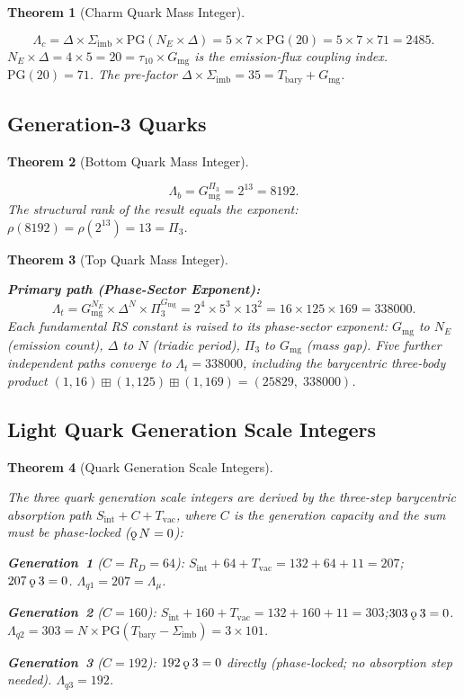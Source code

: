 \documentclass[11pt,letterpaper]{article}
\theoremstyle{plain}
\newtheorem{theorem}{Theorem}[section]
\theoremstyle{definition}
\theoremstyle{remark}
\newcommand{\bplus}{\boxplus}
\newcommand{\rank}{\rho}
\newcommand{\koppa}{\mathbin{\text{\rm\k{o}}}}
\newcommand{\Tbary}{T_{\mathrm{bary}}}
\newcommand{\Sint}{S_{\mathrm{int}}}
\newcommand{\Sigimb}{\Sigma_{\mathrm{imb}}}
\newcommand{\PG}{\mathrm{PG}}
\newcommand{\Gmg}{G_{\mathrm{mg}}}
\newcommand{\Tvac}{T_{\mathrm{vac}}}
\newcommand{\tauX}{\tau_{10}}
\newcommand{\Pithree}{\Pi_3}
\newcommand{\RD}{R_D}
\newcommand{\Lambdamu}{\Lambda_\mu}
\begin{document}
\begin{theorem}[Charm Quark Mass Integer]\label{thm:charm}
\begin{rsbox}
\[
\Lambda_c=\Delta\times\Sigimb\times\PG(N_E\times\Delta)
=5\times7\times\PG(20)=5\times7\times71=2485.
\]
$N_E\times\Delta=4\times5=20=\tauX\times\Gmg$ is the
emission-flux coupling index.  $\PG(20)=71$.  The pre-factor
$\Delta\times\Sigimb=35=\Tbary+\Gmg$.
\end{rsbox}
\end{theorem}

\subsection{Generation-3 Quarks}

\begin{theorem}[Bottom Quark Mass Integer]\label{thm:bottom}
\begin{rsbox}
\[
\Lambda_b=\Gmg^{\Pithree}=2^{13}=8192.
\]
The structural rank of the result equals the exponent:
$\rank(8192)=\rank(2^{13})=13=\Pithree$.
\end{rsbox}
\end{theorem}

\begin{theorem}[Top Quark Mass Integer]\label{thm:top}
\begin{rsbox}
\textbf{Primary path (Phase-Sector Exponent):}
\[
\Lambda_t=\Gmg^{N_E}\times\Delta^N\times\Pithree^{\Gmg}
=2^4\times5^3\times13^2=16\times125\times169=338000.
\]
Each fundamental RS constant is raised to its phase-sector
exponent: $\Gmg$ to $N_E$ (emission count), $\Delta$ to $N$
(triadic period), $\Pithree$ to $\Gmg$ (mass gap).  Five further
independent paths converge to $\Lambda_t=338000$, including the
barycentric three-body product
$(1,16)\bplus(1,125)\bplus(1,169)=(25829,\;338000)$.
\end{rsbox}
\end{theorem}

\subsection{Light Quark Generation Scale Integers}

\begin{theorem}[Quark Generation Scale
Integers]\label{thm:quarkmass}
\begin{rsbox}
The three quark generation scale integers are derived by the
three-step barycentric absorption path $\Sint+C+\Tvac$, where $C$
is the generation capacity and the sum must be phase-locked
($\koppa\,N=0$):

\textbf{Generation~1} ($C=\RD=64$):
$\Sint+64+\Tvac=132+64+11=207$;\quad $207\koppa3=0$.
$\Lambda_{q1}=207=\Lambdamu$.

\textbf{Generation~2} ($C=160$):
$\Sint+160+\Tvac=132+160+11=303$;\quad $303\koppa3=0$.
$\Lambda_{q2}=303=N\times\PG(\Tbary-\Sigimb)=3\times101$.

\textbf{Generation~3} ($C=192$):
$192\koppa3=0$ directly (phase-locked; no absorption step needed).
$\Lambda_{q3}=192$.
\end{rsbox}
\end{theorem}
\end{document}
